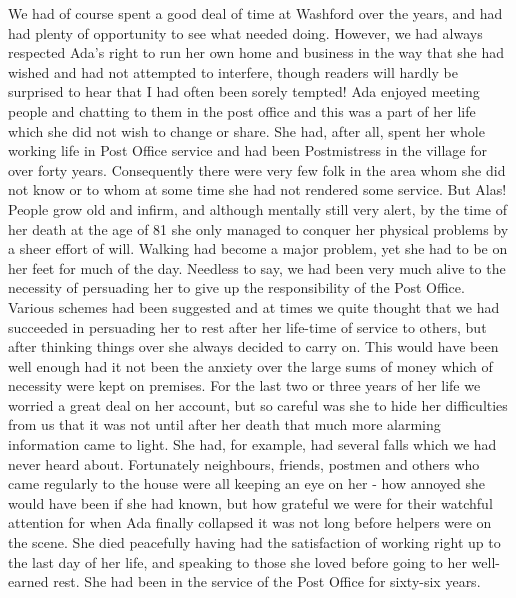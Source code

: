 We had of course spent a good deal of time at Washford over the years, and had had plenty of opportunity to see what needed doing. However, we had always respected Ada's right to run her own home and business in the way that she had wished and had not attempted to interfere, though readers will hardly be surprised to hear that I had often been sorely tempted! Ada enjoyed meeting people and chatting to them in the post office and this was a part of her life which she did not wish to change or share. She had, after all, spent her whole working life in Post Office service and had been Postmistress in the village for over forty years. Consequently there were very few folk in the area whom she did not know or to whom at some time she had not rendered some service. But Alas! People grow old and infirm, and although mentally still very alert, by the time of her death at the age of 81 she only managed to conquer her physical problems by a sheer effort of will. Walking had become a major problem, yet she had to be on her feet for much of the day. Needless to say, we had been very much alive to the necessity of persuading her to give up the responsibility of the Post Office. Various schemes had been suggested and at times we quite thought that we had succeeded in persuading her to rest after her life-time of service to others, but after thinking things over she always decided to carry on. This would have been well enough had it not been the anxiety over the large sums of money which of necessity were kept on premises. For the last two or three years of her life we worried a great deal on her account, but so careful was she to hide her difficulties from us that it was not until after her death that much more alarming information came to light. She had, for example, had several falls which we had never heard about. Fortunately neighbours, friends, postmen and others who came regularly to the house were all keeping an eye on her - how annoyed she would have been if she had known, but how grateful we were for their watchful attention for when Ada finally collapsed it was not long before helpers were on the scene. She died peacefully having had the satisfaction of working right up to the last day of her life, and speaking to those she loved before going to her well-earned rest. She had been in the service of the Post Office for sixty-six years.

